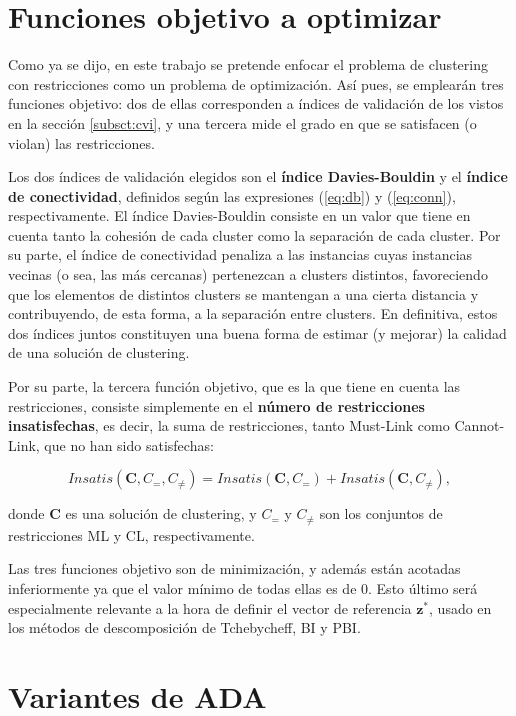\section{Funciones objetivo a optimizar}

Como ya se dijo, en este trabajo se pretende enfocar el problema de clustering con restricciones como un problema de optimización. Así pues, se emplearán tres funciones objetivo: dos de ellas corresponden a índices de validación de los vistos en la sección \ref{subsct:cvi}, y una tercera mide el grado en que se satisfacen (o violan) las restricciones.

Los dos índices de validación elegidos son el \textbf{índice Davies-Bouldin} y el \textbf{índice de conectividad}, definidos según las expresiones (\ref{eq:db}) y (\ref{eq:conn}), respectivamente. El índice Davies-Bouldin consiste en un valor que tiene en cuenta tanto la cohesión de cada cluster como la separación de cada cluster. Por su parte, el índice de conectividad penaliza a las instancias cuyas instancias vecinas (o sea, las más cercanas) pertenezcan a clusters distintos, favoreciendo que los elementos de distintos clusters se mantengan a una cierta distancia y contribuyendo, de esta forma, a la separación entre clusters. En definitiva, estos dos índices juntos constituyen una buena forma de estimar (y mejorar) la calidad de una solución de clustering.

Por su parte, la tercera función objetivo, que es la que tiene en cuenta las restricciones, consiste simplemente en el \textbf{número de restricciones insatisfechas}, es decir, la suma de restricciones, tanto Must-Link como Cannot-Link, que no han sido satisfechas:

\begin{equation}
	Insatis(\textbf{C}, C_{=}, C_{\not=}) = Insatis(\textbf{C},C_{=}) + Insatis(\textbf{C},C_{\not=}),
\end{equation}


donde $\textbf{C}$ es una solución de clustering, y $C_{=}$ y $C_{\not=}$ son los conjuntos de restricciones ML y CL, respectivamente.

Las tres funciones objetivo son de minimización, y además están acotadas inferiormente ya que el valor mínimo de todas ellas es de $0$. Esto último será especialmente relevante a la hora de definir el vector de referencia $\textbf{z}^*$, usado en los métodos de descomposición de Tchebycheff, BI y PBI.

\section{Variantes de ADA}

